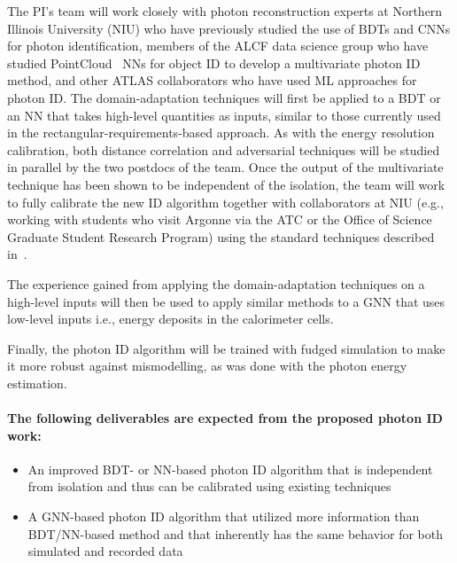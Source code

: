 \documentclass[letter, USenglish, 11pt, subfigure]{article}
\begin{document}
The PI's team will work closely with photon reconstruction experts at Northern Illinois University (NIU) who have previously studied the use of BDTs and CNNs for photon identification, members of the ALCF data science group who have studied PointCloud~\cite{ATL-PHYS-PUB-2021-002} NNs for object ID to develop a multivariate photon ID method, and other ATLAS collaborators who have used ML approaches for photon ID. The domain-adaptation techniques will first be applied to a BDT or an NN that takes high-level quantities as inputs, similar to those currently used in the rectangular-requirements-based approach. As with the energy resolution calibration, both distance correlation and adversarial techniques will be studied in parallel by the two postdocs of the team. Once the output of the multivariate technique has been shown to be independent of the isolation, the team will work to fully calibrate the new ID algorithm together with collaborators at NIU (e.g., working with students who visit Argonne via the ATC or the Office of Science Graduate Student Research Program) using the standard techniques described in~\cite{PERF-2013-04,PERF-2017-02}.

The experience gained from applying the domain-adaptation techniques on a high-level inputs will then be used to apply similar methods to a GNN that uses low-level inputs i.e., energy deposits in the calorimeter cells.

Finally, the photon ID algorithm will be trained with fudged simulation to make it more robust against mismodelling, as was done with the photon energy estimation. 

\paragraph{The following deliverables are expected from the proposed photon ID work:}
\begin{itemize}
\item An improved BDT- or NN-based photon ID algorithm that is independent from isolation and thus can be calibrated using existing techniques
\item A GNN-based photon ID algorithm that utilized more information than BDT/NN-based method and that inherently has the same behavior for both simulated and recorded data
\end{itemize}
\end{document}

